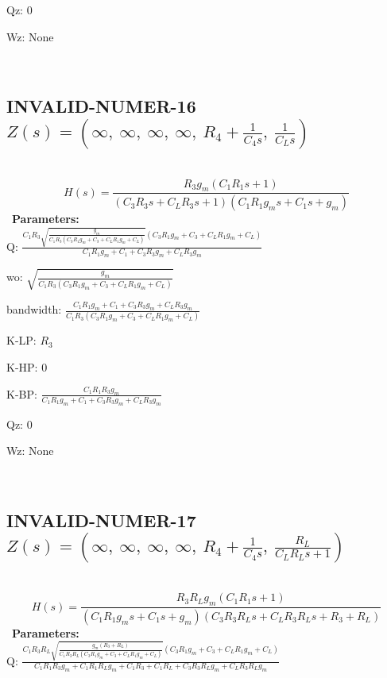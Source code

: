 \documentclass{article}
\begin{document}
Qz: $0$\ 

Wz: $\text{None}$\ 

\ 

\subsection{INVALID-NUMER-16 $Z(s) = \left( \infty, \  \infty, \  \infty, \  \infty, \  R_{4} + \frac{1}{C_{4} s}, \  \frac{1}{C_{L} s}\right)$ } \ 
\textbf{\[H(s) = \frac{R_{3} g_{m} \left(C_{1} R_{1} s + 1\right)}{\left(C_{3} R_{3} s + C_{L} R_{3} s + 1\right) \left(C_{1} R_{1} g_{m} s + C_{1} s + g_{m}\right)}\] } \ 
\textbf{Parameters:}\\ 

Q: $\frac{C_{1} R_{3} \sqrt{\frac{g_{m}}{C_{1} R_{3} \left(C_{3} R_{1} g_{m} + C_{3} + C_{L} R_{1} g_{m} + C_{L}\right)}} \left(C_{3} R_{1} g_{m} + C_{3} + C_{L} R_{1} g_{m} + C_{L}\right)}{C_{1} R_{1} g_{m} + C_{1} + C_{3} R_{3} g_{m} + C_{L} R_{3} g_{m}}$\ 

wo: $\sqrt{\frac{g_{m}}{C_{1} R_{3} \left(C_{3} R_{1} g_{m} + C_{3} + C_{L} R_{1} g_{m} + C_{L}\right)}}$\ 

bandwidth: $\frac{C_{1} R_{1} g_{m} + C_{1} + C_{3} R_{3} g_{m} + C_{L} R_{3} g_{m}}{C_{1} R_{3} \left(C_{3} R_{1} g_{m} + C_{3} + C_{L} R_{1} g_{m} + C_{L}\right)}$\ 

K-LP: $R_{3}$\ 

K-HP: $0$\ 

K-BP: $\frac{C_{1} R_{1} R_{3} g_{m}}{C_{1} R_{1} g_{m} + C_{1} + C_{3} R_{3} g_{m} + C_{L} R_{3} g_{m}}$\ 

Qz: $0$\ 

Wz: $\text{None}$\ 

\ 

\subsection{INVALID-NUMER-17 $Z(s) = \left( \infty, \  \infty, \  \infty, \  \infty, \  R_{4} + \frac{1}{C_{4} s}, \  \frac{R_{L}}{C_{L} R_{L} s + 1}\right)$ } \ 
\textbf{\[H(s) = \frac{R_{3} R_{L} g_{m} \left(C_{1} R_{1} s + 1\right)}{\left(C_{1} R_{1} g_{m} s + C_{1} s + g_{m}\right) \left(C_{3} R_{3} R_{L} s + C_{L} R_{3} R_{L} s + R_{3} + R_{L}\right)}\] } \ 
\textbf{Parameters:}\\ 

Q: $\frac{C_{1} R_{3} R_{L} \sqrt{\frac{g_{m} \left(R_{3} + R_{L}\right)}{C_{1} R_{3} R_{L} \left(C_{3} R_{1} g_{m} + C_{3} + C_{L} R_{1} g_{m} + C_{L}\right)}} \left(C_{3} R_{1} g_{m} + C_{3} + C_{L} R_{1} g_{m} + C_{L}\right)}{C_{1} R_{1} R_{3} g_{m} + C_{1} R_{1} R_{L} g_{m} + C_{1} R_{3} + C_{1} R_{L} + C_{3} R_{3} R_{L} g_{m} + C_{L} R_{3} R_{L} g_{m}}$\ 
\end{document}
